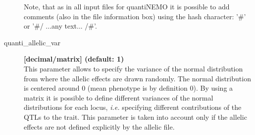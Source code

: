 \documentclass[letterpaper,12pt,oneside]{book}
\begin{document}
\begin{description}
\begin{description}
\end{description} 
Note, that as in all input files for quantiNEMO it is possible to add comments (also in the file information box) using the hash character: '\#' or '\#/ ...any text... /\#'.

\item[quanti\_allelic\_var\index{quanti\_allelic\_var}] \textbf{[decimal/matrix] (default: 1)} \\
This parameter allows to specify the variance of the normal distribution from where the allelic effects are drawn randomly. The normal distribution is centered around 0 (mean phenotype is by definition 0). By using a matrix it is possible to define different variances of the normal distributions for each locus, \textit{i.e.} specifying different contributions of the QTLs to the trait. This parameter is taken into account only if the allelic effects are not defined explicitly by the allelic file.
\end{description} 
\end{document}
